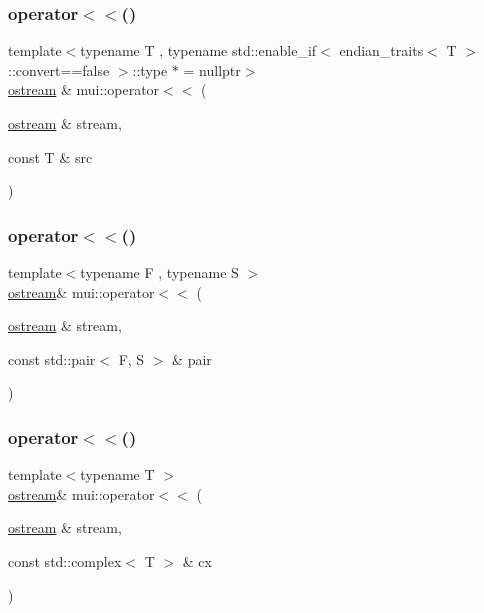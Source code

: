 \mbox{\label{namespacemui_ada7c54d117021dc19d88dd3652ec4bb2}} 
\subsubsection{\texorpdfstring{operator$<$$<$()}{operator<<()}\hspace{0.1cm}{\footnotesize\ttfamily [17/21]}}
{\footnotesize\ttfamily template$<$typename T , typename std\+::enable\+\_\+if$<$ endian\+\_\+traits$<$ T $>$\+::convert==false $>$\+::type $\ast$  = nullptr$>$ \\
\hyperlink{classmui_1_1ostream}{ostream} \& mui\+::operator$<$$<$ (\begin{DoxyParamCaption}\item[{\hyperlink{classmui_1_1ostream}{ostream} \&}]{stream,  }\item[{const T \&}]{src }\end{DoxyParamCaption})}

\mbox{\label{namespacemui_aa059f4e5dfbb75a3846533030db8053a}} 
\subsubsection{\texorpdfstring{operator$<$$<$()}{operator<<()}\hspace{0.1cm}{\footnotesize\ttfamily [18/21]}}
{\footnotesize\ttfamily template$<$typename F , typename S $>$ \\
\hyperlink{classmui_1_1ostream}{ostream}\& mui\+::operator$<$$<$ (\begin{DoxyParamCaption}\item[{\hyperlink{classmui_1_1ostream}{ostream} \&}]{stream,  }\item[{const std\+::pair$<$ F, S $>$ \&}]{pair }\end{DoxyParamCaption})}

\mbox{\label{namespacemui_a12c2d4835c31fb8b30f87b2efe74d347}} 
\subsubsection{\texorpdfstring{operator$<$$<$()}{operator<<()}\hspace{0.1cm}{\footnotesize\ttfamily [19/21]}}
{\footnotesize\ttfamily template$<$typename T $>$ \\
\hyperlink{classmui_1_1ostream}{ostream}\& mui\+::operator$<$$<$ (\begin{DoxyParamCaption}\item[{\hyperlink{classmui_1_1ostream}{ostream} \&}]{stream,  }\item[{const std\+::complex$<$ T $>$ \&}]{cx }\end{DoxyParamCaption})}

